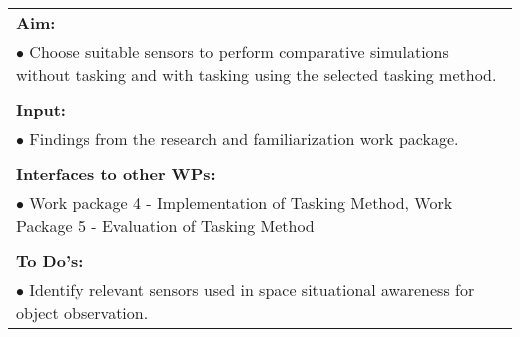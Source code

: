 \begin{table}[!h]
\begin{center}
\begin{tabular}{|p{35mm}||p{55mm}|p{50mm}||p{40mm}|}
      \hline\hline
      \multicolumn{4}{|p{150mm}|}{\textbf{Aim:}}                                                                                                                                                            \\
      \multicolumn{4}{|p{150mm}|}{$\bullet$ Choose suitable sensors to perform comparative simulations without tasking and with tasking using the selected tasking method.}                                                   \\
      \multicolumn{4}{|p{150mm}|}{}                                                                                                                                                                           \\
      \multicolumn{4}{|p{150mm}|}{\textbf{Input:}}                                                                                                                                                            \\
      \multicolumn{4}{|p{150mm}|}{$\bullet$ Findings from the research and familiarization work package.}                                                                                                                                 \\
      \multicolumn{4}{|p{150mm}|}{}                                                                                                                                                                           \\
      \multicolumn{4}{|p{150mm}|}{\textbf{Interfaces to other WPs:}}                                                                                                                                    \\
      \multicolumn{4}{|p{150mm}|}{$\bullet$ Work package 4 - Implementation of Tasking Method, Work Package 5 - Evaluation of Tasking Method}                                                                                              \\
      \multicolumn{4}{|p{150mm}|}{}                                                                                                                                                                           \\
      \multicolumn{4}{|p{150mm}|}{\textbf{To Do's:}}                                                                                                                                                         \\
      \multicolumn{4}{|p{150mm}|}{$\bullet$ Identify relevant sensors used in space situational awareness for object observation.}\\

\end{tabular}
\end{center}
\end{table}
